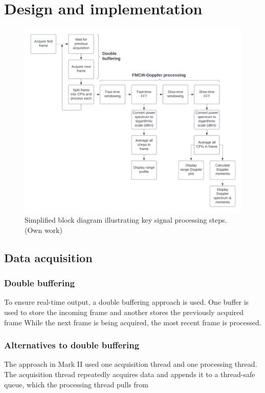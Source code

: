 \documentclass{article}
\begin{document}
\section{Design and implementation}
\begin{figure}
	\centering
	\includegraphics[width=\textwidth]{signal-processing-diagram}
	\caption{Simplified block diagram illustrating key signal processing steps. (Own work)}
	\label{fig:SignalProcessingDiagram}
\end{figure}

\subsection{Data acquisition}
\subsubsection{Double buffering}
To ensure real-time output, a double buffering approach is used.
One buffer is used to store the incoming frame and another stores the previously acquired frame 
While the next frame is being acquired, the most recent frame is processed.

\subsubsection{Alternatives to double buffering}
The approach in Mark II used one acquisition thread and one processing thread. The acquisition thread repeatedly acquires data and appends it to a thread-safe queue, which the processing thread pulls from
\end{document}
